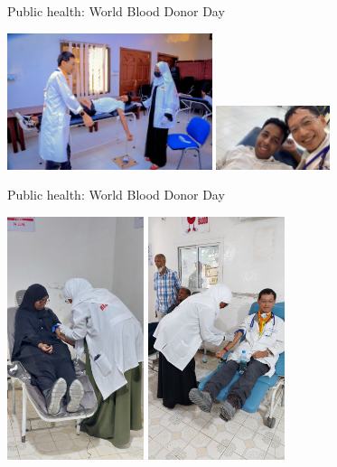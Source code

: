 \documentclass[aspectratio=169]{beamer}
\begin{document}
\begin{frame}{Public health: World Blood Donor Day}
    \begin{center}
        
        \includegraphics[width=0.45\textwidth]{IMG-5110.JPG}
        \includegraphics[width=0.25\textwidth]{IMG-5112.JPG}
    \end{center}
\end{frame}

\begin{frame}{Public health: World Blood Donor Day}
    \begin{center}
        
        \includegraphics[width=0.30\textwidth]{IMG-4371.JPG}
        \includegraphics[width=0.30\textwidth]{IMG-4370.JPG}
    \end{center}
\end{frame}
\end{document}
